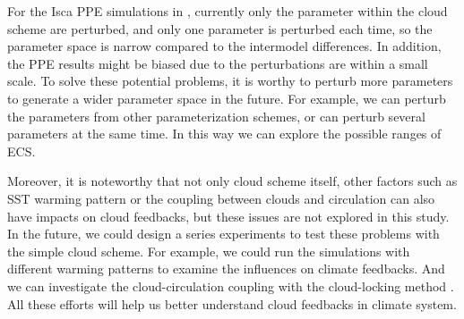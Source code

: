 For the Isca PPE simulations in , currently only the parameter within the cloud scheme are perturbed, and only one parameter is perturbed each time, so the parameter space is narrow compared to the intermodel differences. In addition, the PPE results might be biased due to the perturbations are within a small scale. To solve these potential problems, it is worthy to perturb more parameters to generate a wider parameter space in the future. For example, we can perturb the parameters from other parameterization schemes, or can perturb several parameters at the same time. In this way we can explore the possible ranges of ECS.

Moreover, it is noteworthy that not only cloud scheme itself, other factors such as SST warming pattern \citep[e.g.,][]{Zhou2016,Dong2019attributing,Dong2020intermodel} or the coupling between clouds and circulation \citep[e.g.,][]{Bony2004,Vial2013} can also have impacts on cloud feedbacks, but these issues are not explored in this study. In the future, we could design a series experiments to test these problems with the simple cloud scheme. For example, we could run the simulations with different warming patterns to examine the influences on climate feedbacks. And we can investigate the cloud-circulation coupling with the cloud-locking method \citep[e.g.,][]{Voigt2020review}. All these efforts will help us better understand cloud feedbacks in climate system.


%
%

%
